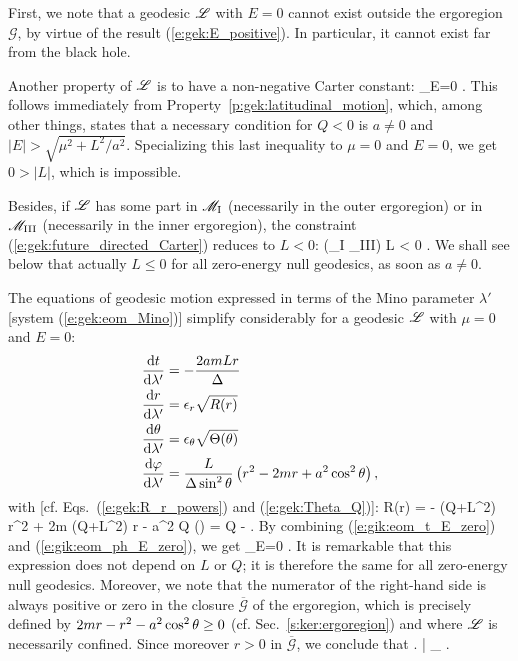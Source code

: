 First, we note that a geodesic $\mathscr{L}$ with $E=0$ cannot exist outside the ergoregion
$\mathscr{G}$, by virtue of the result (\ref{e:gek:E_positive}). In particular,
it cannot exist far from the black hole.

Another property of $\mathscr{L}$ is to have a non-negative Carter constant:
\be \label{e:gik:Q_nonneg_E_zero}
   _{E=0} .
\ee
This follows immediately from Property~\ref{p:gek:latitudinal_motion},
which, among other things,
states that a necessary condition for $Q < 0$ is $a\neq 0$ and
$|E| > \sqrt{\mu^2 + L^2/a^2}$. Specializing this last inequality to $\mu=0$
and $E=0$, we get $0 > |L|$, which is impossible.

Besides, if $\mathscr{L}$ has some part in $\mathscr{M}_{\rm I}$ (necessarily in the outer ergoregion)
or in $\mathscr{M}_{\rm III}$ (necessarily in the inner ergoregion),
the constraint (\ref{e:gek:future_directed_Carter})
reduces to $L<0$:
\be \label{e:gik:E_zero_L_neg_ergo}
    \Li \cap (\M_{\rm I} \cup \M_{\rm III}) \neq  \varnothing \quad \Longrightarrow \quad L < 0 .
\ee
We shall see below that actually $L \leq 0$ for all zero-energy null geodesics, as soon as $a\neq 0$.

The equations of geodesic motion expressed in terms of the Mino parameter $\lambda'$
[system (\ref{e:gek:eom_Mino})] simplify considerably for a geodesic $\mathscr{L}$ with $\mu=0$ and $E=0$:
\begin{subequations}
\begin{align}
&  \frac{\mathrm{d} t}{\mathrm{d} \lambda'} = - \frac{2 a m L r}{\Delta} \label{e:gik:eom_t_E_zero} \\
&  \frac{\mathrm{d} r}{\mathrm{d} \lambda'} = \epsilon_r \sqrt{ R(r) }  \label{e:gik:eom_r_E_zero}\\
&  \frac{\mathrm{d} \theta}{\mathrm{d} \lambda'} = \epsilon_\theta \sqrt{\Theta(\theta)}  \\
&  \frac{\mathrm{d} \varphi}{\mathrm{d} \lambda'}  = \frac{L}{\Delta\sin^2\theta} \left( r^2 - 2 m r + a^2\cos^2\theta \right) ,
                                \label{e:gik:eom_ph_E_zero}
\end{align}
\end{subequations}
with [cf. Eqs.~(\ref{e:gek:R_r_powers}) and (\ref{e:gek:Theta_Q})]:
\be \label{e:gik:R_E_zero}
    R(r) = - (Q+L^2) r^2 + 2m (Q+L^2) r - a^2 Q
\ee
\be \label{e:gik:Theta_E_zero}
    \Theta(\th) = Q -  .
\ee
By combining (\ref{e:gik:eom_t_E_zero}) and (\ref{e:gik:eom_ph_E_zero}), we get
\be
    _{E=0} .
\ee
It is remarkable that this expression does not depend on $L$ or $Q$; it is therefore the
same for all zero-energy null geodesics. Moreover, we note that the numerator
of the right-hand side is always positive or zero in the closure $\overline{\mathscr{G}}$ of the ergoregion,
which is precisely defined by $2mr - r^2 - a^2\cos^2\theta \geq 0$ (cf. Sec.~\ref{s:ker:ergoregion})
and where $\mathscr{L}$ is necessarily confined. Since moreover $r > 0$ in $\overline{\mathscr{G}}$,
we conclude that
\be
    \left.  \right| _{\Li}  .
\ee


